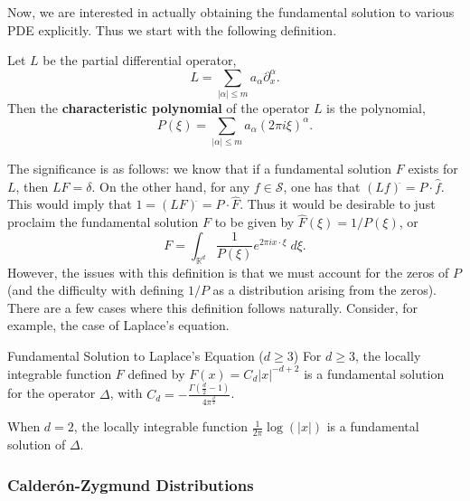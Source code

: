 \documentclass{article}
\begin{document}
Now, we are interested in actually obtaining the fundamental solution to various PDE explicitly. Thus we start with the following definition. 

\begin{definition}
	Let $L$ be the partial differential operator, 
	\begin{equation*}
		L = \sum_{|\alpha|\leq m}a_{\alpha}\partial_{x}^{\alpha}. 
	\end{equation*} 
	Then the \textbf{characteristic polynomial} of the operator $L$ is the polynomial, 
	\begin{equation*}
		P(\xi) = \sum_{|\alpha|\leq m}a_{\alpha}(2\pi i \xi)^{\alpha}. 
	\end{equation*} 
\end{definition} 
The significance is as follows: we know that if a fundamental solution $F$ exists for $L$, then $LF = \delta$. On the other hand, for any $f \in \mathcal{S}$, one has that $(Lf)^{\hat{}} = P \cdot \hat{f}$. This would imply that $1 = (LF)^{\hat{}} = P \cdot \hat{F}$. Thus it would be desirable to just proclaim the fundamental solution $F$ to be given by $\hat{F}(\xi) = 1/P(\xi)$, or 
\begin{equation*}
	F = \int_{\mathbb{R}^{d}}\frac{1}{P(\xi)}e^{2\pi i x \cdot \xi}\;d\xi. 
\end{equation*}
However, the issues with this definition is that we must account for the zeros of $P$ (and the difficulty with defining $1/P$ as a distribution arising from the zeros). There are a few cases where this definition follows naturally. Consider, for example, the case of Laplace's equation. 

\begin{theorem}{Fundamental Solution to Laplace's Equation ($d\geq 3$)}
	For $d \geq 3$, the locally integrable function $F$ defined by $F(x) = C_{d}|x|^{-d + 2}$ is a fundamental solution for the operator $\Delta$, with $C_{d} = - \frac{\Gamma(\frac{d}{2} - 1)}{4\pi^{\frac{d}{2}}}$. 
\end{theorem} 

\begin{theorem}[Fundamental Solution to Laplace's Equation ($d = 2$)]
	When $d = 2$, the locally integrable function $\frac{1}{2\pi}\log(|x|)$ is a fundamental solution of $\Delta$. 
\end{theorem} 


\subsubsection{Calder{\'o}n-Zygmund Distributions}
\end{document}
